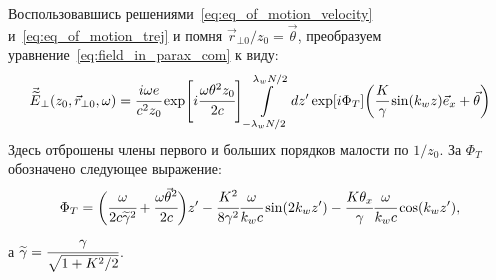 Воспользовавшись решениями~\ref{eq:eq_of_motion_velocity} и~\ref{eq:eq_of_motion_trej} и помня $\vec{r}_{\bot 0}/z_0 = \vec{\theta}$, преобразуем уравнение~\ref{eq:field_in_parax_com} к виду:
\begin{equation}
	\label{eq:field_in_parax}
	\begin{array}{lcl}
		\vec{\widetilde{E}}_{\bot}(z_0,  \vec{r}_{\bot 0}, \omega) =
		\cfrac{i\omega e}{c^2z_0} \exp[i\cfrac{\omega \theta^2 z_0}{2c}]
	 	\displaystyle\int\limits_{-\lambda_w N/2}^{\lambda_w N/2} dz'\exp[i\Phi_T]
		\bigg(\cfrac{K}{\gamma}\sin(k_w z)\vec{e}_x + \vec{\theta}\bigg)
	\end{array}	
\end{equation}
Здесь отброшены члены первого и больших порядков малости по $1/z_0$. За $\Phi_T$ обозначено следующее выражение:
\begin{equation}
	\Phi_T = 
	\bigg(\cfrac{\omega}{2c\widetilde{\gamma}^2} + 
	\cfrac{\omega\vec{\theta}^2}{2c}\bigg)z' - 
	\cfrac{K^2}{8\gamma^2}\cfrac{\omega}{k_w c}\sin(2k_wz') - \cfrac{K{\theta_x}}{\gamma}\cfrac{\omega}{k_w c}\cos(k_w z'),
\end{equation}
а $\widetilde{\gamma} = \cfrac{\gamma}{\sqrt{1 + K^2/2}}$.\\

